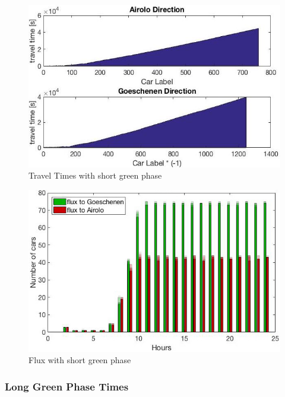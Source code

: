\documentclass[11pt,a4paper,parskip=half-]{article}
\begin{document}
\begin{figure}[h!]
\includegraphics[scale=0.63]{traveltimes_2:3}
\centering
\vspace*{-4mm}
\caption{Travel Times with short green phase}
\label{fig:traveltimes2_3}
\end{figure}

\begin{figure}[h!]
\includegraphics[scale=0.63]{shortbase2_3}
\centering
\vspace*{-4mm}
\caption{Flux with short green phase}
\label{fig:flux2_3}
\end{figure}


\clearpage




\subsubsection{Long Green Phase Times}
\end{document}
